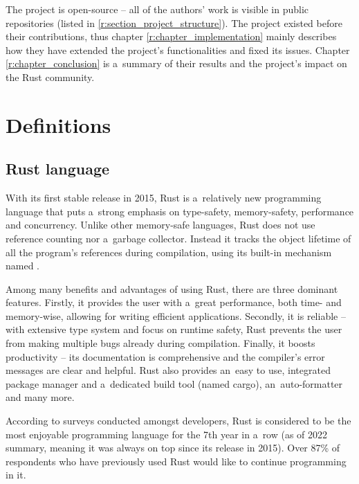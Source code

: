 \documentclass[licencjacka,en]{pracamgr}
\begin{document}
The project is open-source -- all of the authors' work is visible in public repositories (listed in
\ref{r:section_project_structure}). The project existed before their contributions, thus chapter
\ref{r:chapter_implementation} mainly describes how they have extended the project's
functionalities and fixed its issues. Chapter \ref{r:chapter_conclusion} is a~summary of their
results and the project's impact on the Rust community.


\chapter{Definitions}\label{r:chapter_definitions}

\section{Rust language}\label{r:section_rust_language}

With its first stable release in 2015, Rust is a~relatively new programming language that
puts a~strong emphasis on type-safety, memory-safety, performance and concurrency. Unlike
other memory-safe languages, Rust does not use reference counting nor a~garbage collector.
Instead it tracks the object lifetime of all the program's references during compilation,
using its built-in mechanism named .

Among many benefits and advantages of using Rust, there are three dominant features. Firstly,
it provides the user with a~great performance, both time- and memory-wise, allowing for
writing efficient applications. Secondly, it is reliable -- with extensive type system and
focus on runtime safety, Rust prevents the user from making multiple bugs
already during compilation. Finally, it boosts productivity -- its documentation is
comprehensive and the compiler's error messages are clear and helpful. Rust also provides
an~easy to use, integrated package manager and a~dedicated build tool (named cargo),
an~auto-formatter and many more.

According to surveys \cite{survey} conducted amongst developers, Rust is considered to be the most
enjoyable programming language for the 7th year in a~row (as of 2022 summary, meaning it was always
on top since its release in 2015). Over 87\% of respondents who have previously used Rust would
like to continue programming in it.
\end{document}
